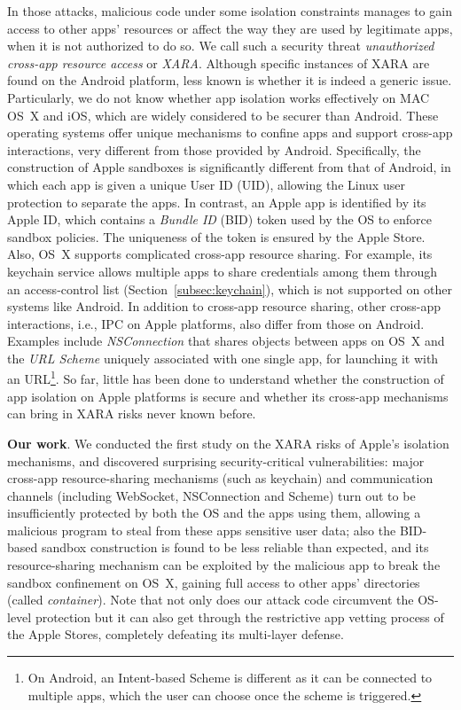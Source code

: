 \documentclass{article}
\begin{document}
In those attacks, malicious code under some isolation constraints manages to gain access to other apps' resources or affect the way they are used by legitimate apps, when it is not authorized to do so. We call such a security threat \textit{unauthorized cross-app resource access} or \textit{XARA}. Although specific instances of XARA are found on the Android platform, less known is whether it is indeed a generic issue. Particularly, we do not know whether app isolation works effectively on MAC OS~X and iOS, which are widely considered to be securer than Android.  These operating systems offer unique mechanisms to confine apps and support cross-app interactions, very different from those provided by Android.  Specifically, the construction of Apple sandboxes is significantly different from that of Android, in which each app is given a unique User ID (UID), allowing the Linux user protection to separate the apps.  In contrast, an Apple app is identified by its Apple ID, which contains a \textit{Bundle ID} (BID) token used by the OS to enforce sandbox policies. The uniqueness of the token is ensured by the Apple Store. Also, OS~X supports complicated cross-app resource sharing. For example, its keychain service allows multiple apps to share credentials among them through an access-control list (Section~\ref{subsec:keychain}), which is not supported on other systems like Android. In addition to cross-app resource sharing, other cross-app interactions, i.e., IPC on Apple platforms, also differ from those on Android. Examples include \textit{NSConnection} that shares objects between apps on OS~X and the \textit{URL Scheme} uniquely associated with one single app, for launching it with an URL\footnote{\small On Android, an Intent-based Scheme is different as it can be connected to multiple apps, which the user can choose once the scheme is triggered.}. So far, little has been done to understand whether the construction of app isolation on Apple platforms is secure and whether its cross-app mechanisms can bring in XARA risks never known before.

\vspace {3pt}\noindent\textbf{Our work}. We conducted the first study on the XARA risks of Apple's isolation mechanisms, and discovered surprising security-critical vulnerabilities: major cross-app resource-sharing mechanisms (such as keychain) and communication channels (including WebSocket, NSConnection and Scheme) turn out to be insufficiently protected by both the OS and the apps using them, allowing a malicious program to steal from these apps sensitive user data; also the BID-based sandbox construction is found to be less reliable than expected, and its resource-sharing mechanism can be exploited by the malicious app to break the sandbox confinement on OS~X, gaining full access to other apps' directories (called \textit{container}). Note that not only does our attack code circumvent the OS-level protection but it can also get through the restrictive app vetting process of the Apple Stores, completely defeating its multi-layer defense.
\end{document}
